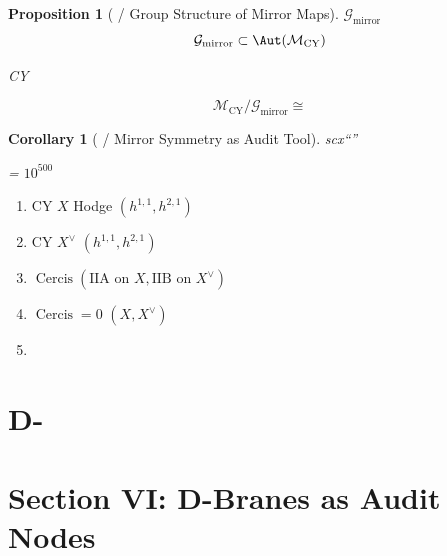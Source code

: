 \documentclass[12pt,a4paper]{article}
\theoremstyle{plain}
\newtheorem{proposition}[theorem]{ Proposition}
\newtheorem{corollary}[theorem]{ Corollary}
\theoremstyle{definition}
\newcommand{\Gauge}{\mathcal{G}}
\newcommand{\M}{\mathcal{M}}
\DeclareMathOperator{\Cercis}{Cercis}
\begin{document}

\subsection{}

\begin{proposition}[ / Group Structure of Mirror Maps]
 $\Gauge_{\text{mirror}}$
\begin{equation}
    \Gauge_{\text{mirror}} \subset \Aut(\M_{\text{CY}})
\end{equation}

 CY 

\begin{equation}
    \M_{\text{CY}} / \Gauge_{\text{mirror}} \cong \text{}
\end{equation}
\end{proposition}

\begin{corollary}[ / Mirror Symmetry as Audit Tool]
\textbf{}
scx``''

 = 
$10^{500}$ 
\end{corollary}

\begin{scxbox}
\textbf{}
\begin{enumerate}
    \item  CY  $X$ Hodge  $(h^{1,1}, h^{2,1})$
    \item  CY $X^\vee$ $(h^{1,1}, h^{2,1})$ 
    \item  $\Cercis(\text{IIA on } X, \text{IIB on } X^\vee)$
    \item  $\Cercis = 0$ $(X, X^\vee)$ 
    \item 
\end{enumerate}
\end{scxbox}

\newpage


\section{D-}
\section*{Section VI: D-Branes as Audit Nodes}
\end{document}
